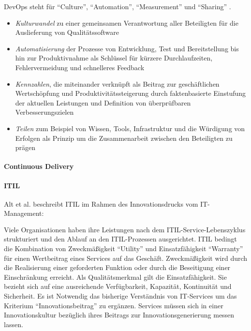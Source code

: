 DevOps steht für \enquote{Culture}, \enquote{Automation}, \enquote{Measurement} und \enquote{Sharing} \cite{humble:2011}. 
\begin{itemize}
    \item \emph{Kulturwandel} zu einer gemeinsamen Verantwortung aller Beteiligten für die Auslieferung von Qualitätssoftware
    \item \emph{Automatisierung} der Prozesse von Entwicklung, Test und Bereitstellung bis hin zur Produktivnahme als Schlüssel für kürzere Durchlaufzeiten, Fehlervermeidung und schnelleres Feedback
    \item \emph{Kennzahlen}, die miteinander verknüpft als Beitrag zur geschäftlichen Wertschöpfung und Produktivitätssteigerung durch faktenbasierte Einstufung der aktuellen Leistungen und Definition von überprüfbaren Verbesserungszielen
    \item \emph{Teilen} zum Beispiel von Wissen, Tools, Infrastruktur und die Würdigung von Erfolgen als Prinzip um die Zusammenarbeit zwischen den Beteiligten zu prägen
\end{itemize}

\cite{Alt2017}

\paragraph{Continuous Delivery}

\paragraph{ITIL}
Alt et al. beschreibt ITIL im Rahmen des Innovationsdrucks vom IT-Management:

Viele Organisationen haben ihre Leistungen nach dem ITIL-Service-Lebenszyklus strukturiert und den Ablauf an den ITIL-Prozessen ausgerichtet. ITIL bedingt die Kombination von Zweckmäßigkeit \enquote{Utility} und Einsatzfähigkeit \enquote{Warranty} für einen Wertbeitrag eines Services auf das Geschäft. Zweckmäßigkeit wird durch die Realisierung einer geforderten Funktion oder durch die Beseitigung einer Einschränkung erreicht. Als Qualitätsmerkmal gilt die Einsatzfähigkeit. Sie bezieht sich auf eine ausreichende Verfügbarkeit, Kapazität, Kontinuität und Sicherheit. Es ist Notwendig das bisherige Verständnis von IT-Services um das Kriterium \enquote{Innovationsbeitrag} zu ergänzen. Services müssen sich in einer Innovationskultur bezüglich ihres Beitrags zur Innovationsgenerierung messen lassen.

\cite{Alt2017}


